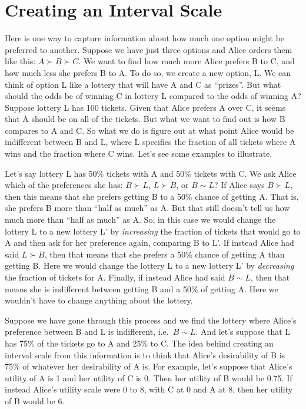 \documentclass[]{tufte-book}
\begin{document}
\hypertarget{creating-an-interval-scale}{%
\section{Creating an Interval Scale}\label{creating-an-interval-scale}}

Here is one way to capture information about how much one option might be preferred to another. Suppose we have just three options and Alice orders them like this: \(A\succ B \succ C\). We want to find how much more Alice prefers B to C, and how much less she prefers B to A. To do so, we create a new option, L. We can think of option L like a lottery that will have A and C as ``prizes''. But what should the odds be of winning C in lottery L compared to the odds of winning A? Suppose lottery L has 100 tickets. Given that Alice prefers A over C, it seems that A should be on all of the tickets. But what we want to find out is how B compares to A and C. So what we do is figure out at what point Alice would be indifferent between B and L, where L specifies the fraction of all tickets where A wins and the fraction where C wins. Let's see some examples to illustrate.

Let's say lottery L has 50\% tickets with A and 50\% tickets with C. We ask Alice which of the preferences she has: \(B\succ L\), \(L\succ B\), or \(B\sim L\)? If Alice says \(B\succ L\), then this means that she prefers getting B to a 50\% chance of getting A. That is, she prefers B more than ``half as much'' as A. But that still doesn't tell us how much more than ``half as much'' as A. So, in this case we would change the lottery L to a new lottery L' by \emph{increasing} the fraction of tickets that would go to A and then ask for her preference again, comparing B to L'. If instead Alice had said \(L\succ B\), then that means that she prefers a 50\% chance of getting A than getting B. Here we would change the lottery L to a new lottery L' by \emph{decreasing} the fraction of tickets for A. Finally, if instead Alice had said \(B\sim L\), then that means she is indifferent between getting B and a 50\% of getting A. Here we wouldn't have to change anything about the lottery.

Suppose we have gone through this process and we find the lottery where Alice's preference between B and L is indifferent, i.e.~\(B\sim L\). And let's suppose that L has 75\% of the tickets go to A and 25\% to C. The idea behind creating an interval scale from this information is to think that Alice's desirability of B is 75\% of whatever her desirability of A is. For example, let's suppose that Alice's utility of A is 1 and her utility of C is 0. Then her utility of B would be 0.75. If instead Alice's utility scale were 0 to 8, with C at 0 and A at 8, then her utility of B would be 6.
\end{document}
